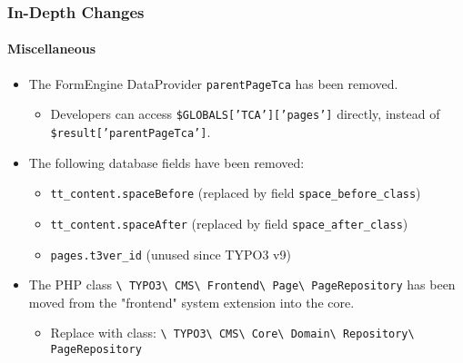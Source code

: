 
\begin{frame}[fragile]
	\frametitle{In-Depth Changes}
	\framesubtitle{Miscellaneous}

	\begin{itemize}
		\item The FormEngine DataProvider \texttt{parentPageTca} has been removed.

			\begin{itemize}\smaller
				\item[\ding{228}] Developers can access \texttt{\$GLOBALS['TCA']['pages']} directly, instead of \texttt{\$result['parentPageTca']}.
			\end{itemize}\normalsize

		\item The following database fields have been removed:

			\begin{itemize}\smaller
				\item \texttt{tt\_content.spaceBefore} (replaced by field \texttt{space\_before\_class})
				\item \texttt{tt\_content.spaceAfter} (replaced by field \texttt{space\_after\_class})
				\item \texttt{pages.t3ver\_id} (unused since TYPO3 v9)
			\end{itemize}\normalsize

		\item The PHP class
			\texttt{\textbackslash
				TYPO3\textbackslash
				CMS\textbackslash
				Frontend\textbackslash
				Page\textbackslash
				PageRepository} has been moved from the "frontend" system extension into the core.

			\begin{itemize}\smaller
				\item Replace with class:
					\texttt{\textbackslash
						TYPO3\textbackslash
						CMS\textbackslash
						Core\textbackslash
						Domain\textbackslash
						Repository\textbackslash
						PageRepository}
			\end{itemize}\normalsize

	\end{itemize}

\end{frame}

